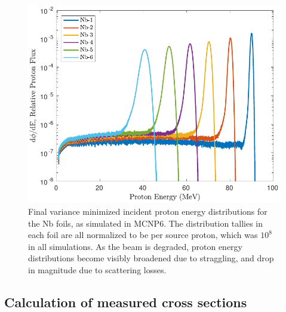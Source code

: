 \documentclass[3p]{elsarticle}
\begin{document}
\begin{figure}
 \centering
 \includegraphics[scale=.8]{./figures/Nb_ptallies.pdf}
 \caption{Final variance minimized incident proton energy distributions for the Nb foils, as simulated in MCNP6. The distribution tallies in each foil are all normalized to be per source proton, which was $10^8$ in all simulations. As the beam is degraded, proton energy distributions become visibly broadened due to straggling, and drop in magnitude due to scattering losses.}
 \label{fig:Nb_ptallies}
\end{figure}







\subsection{Calculation of measured cross sections}\label{sec:calcs_sec}

\end{document}
